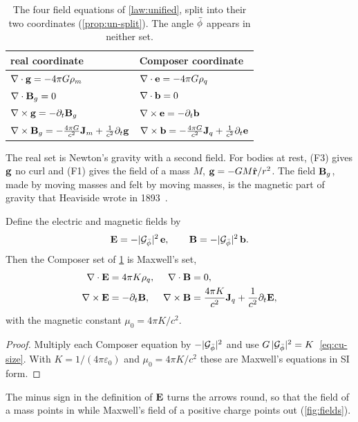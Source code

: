 \begin{table}[t]
\caption{The four field equations of \cref{law:unified}, split into their two coordinates (\cref{prop:un-split}). The angle $\bar{\phi}$ appears in neither set.}
\label{tab:un-split}
\small\centering
\begin{tabular}{@{}ll@{}}
\toprule
real coordinate & Composer coordinate \\
\midrule
$\nabla\cdot\mathbf{g} = -4\pi G\rho_m$ & $\nabla\cdot\mathbf{e} = -4\pi G\rho_q$ \\[2pt]
$\nabla\cdot\mathbf{B}_g = 0$ & $\nabla\cdot\mathbf{b} = 0$ \\[2pt]
$\nabla\times\mathbf{g} = -\partial_t\mathbf{B}_g$ & $\nabla\times\mathbf{e} = -\partial_t\mathbf{b}$ \\[2pt]
$\nabla\times\mathbf{B}_g = -\frac{4\pi G}{c^2}\mathbf{J}_m + \frac{1}{c^2}\partial_t\mathbf{g}$ & $\nabla\times\mathbf{b} = -\frac{4\pi G}{c^2}\mathbf{J}_q + \frac{1}{c^2}\partial_t\mathbf{e}$ \\
\bottomrule
\end{tabular}
\end{table}

The real set is Newton's gravity with a second field. For bodies at rest, (F3) gives $\mathbf{g}$ no curl and (F1) gives the field of a mass $M$, $\mathbf{g} = -GM\hat{\mathbf{r}}/r^2$. The field $\mathbf{B}_g$, made by moving masses and felt by moving masses, is the magnetic part of gravity that Heaviside wrote in 1893~\citep{Heaviside1893}.

\begin{theorem}\label{thm:un-maxwell}
Define the electric and magnetic fields by
\[
\mathbf{E} = -\lvert\mathcal{G}_{\bar{\phi}}\rvert^2\,\mathbf{e} , \qquad \mathbf{B} = -\lvert\mathcal{G}_{\bar{\phi}}\rvert^2\,\mathbf{b} .
\]
Then the Composer set of \cref{tab:un-split} is Maxwell's set,
\begin{align*}
\nabla\cdot\mathbf{E} &= 4\pi K\rho_q , & \nabla\cdot\mathbf{B} &= 0 ,\\
\nabla\times\mathbf{E} &= -\partial_t\mathbf{B} , & \nabla\times\mathbf{B} &= \frac{4\pi K}{c^2}\mathbf{J}_q + \frac{1}{c^2}\partial_t\mathbf{E} ,
\end{align*}
with the magnetic constant $\mu_0 = 4\pi K/c^2$.
\end{theorem}

\begin{proof}
Multiply each Composer equation by $-\lvert\mathcal{G}_{\bar{\phi}}\rvert^2$ and use $G\,\lvert\mathcal{G}_{\bar{\phi}}\rvert^2 = K$~\cref{eq:cu-size}. With $K = 1/(4\pi\varepsilon_0)$ and $\mu_0 = 4\pi K/c^2$ these are Maxwell's equations in SI form.
\end{proof}

The minus sign in the definition of $\mathbf{E}$ turns the arrows round, so that the field of a mass points in while Maxwell's field of a positive charge points out (\cref{fig:fields}).

